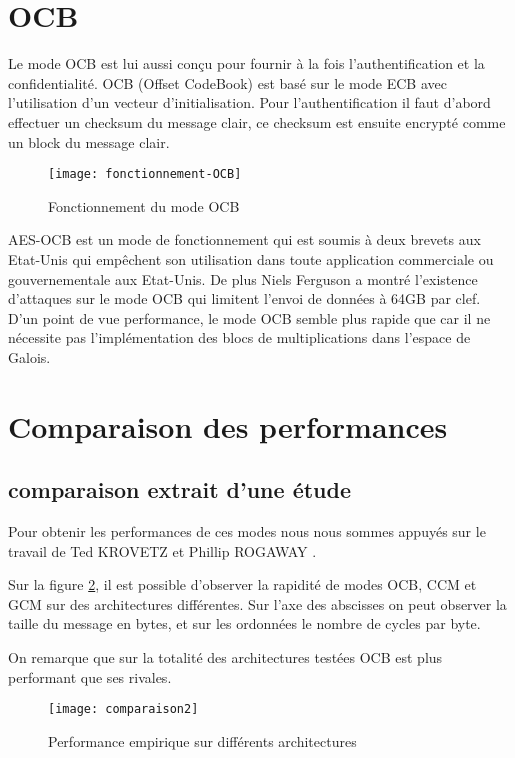 \newpage


\section{OCB}
Le mode OCB est lui aussi conçu pour fournir à la fois l'authentification et la confidentialité. OCB (Offset CodeBook) est basé sur le mode ECB avec l'utilisation d'un vecteur d'initialisation. Pour l'authentification il faut d'abord effectuer un checksum du message clair, ce checksum est ensuite encrypté comme un block du message clair. 

\begin{figure}[!h]
  \centering
  \texttt{[image: fonctionnement-OCB]}
  \caption{Fonctionnement du mode OCB}
  \label{Fonctionnement du mode OCB}
\end{figure}

AES-OCB est un mode de fonctionnement qui est soumis à deux brevets aux Etat-Unis qui empêchent son utilisation dans toute application commerciale ou gouvernementale aux Etat-Unis. 
De plus Niels Ferguson a montré l'existence d'attaques sur le mode OCB qui limitent l'envoi de données à 64GB par clef. D'un point de vue performance, le mode OCB semble plus rapide que \aes car il ne nécessite pas l'implémentation des blocs de multiplications dans l'espace de Galois.


\section{Comparaison des performances}

\subsection{comparaison extrait d'une étude}


Pour obtenir les performances de ces modes nous nous sommes appuyés sur le travail de Ted KROVETZ et Phillip ROGAWAY \cite{compa}.

Sur la figure \ref{fig:compa}, il est possible d'observer la rapidité de modes OCB, CCM et GCM sur des architectures différentes. Sur l'axe des abscisses on peut observer la taille du message en bytes, et sur les ordonnées le nombre de cycles par byte.

On remarque que sur la totalité des architectures testées OCB est plus performant que ses rivales.

\begin{figure}[!h]
  \centering
  \texttt{[image: comparaison2]}
  \caption{Performance empirique sur différents architectures\cite{compa}}
  \label{fig:compa}
\end{figure}

